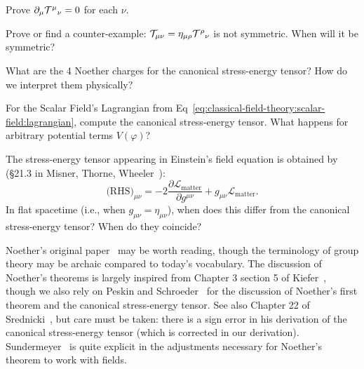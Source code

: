 \begin{exercise}
Prove $\partial_{\mu}{\mathcal{T}^{\mu}}_{\nu}=0$ for each $\nu$.
\end{exercise}

\begin{exercise}
Prove or find a counter-example: $\mathcal{T}_{\mu\nu}=\eta_{\mu\rho}{\mathcal{T}^{\rho}}_{\nu}$
is not symmetric. When will it be symmetric?
\end{exercise}

\begin{exercise}
What are the 4 Noether charges for the canonical stress-energy tensor?
How do we interpret them physically?
\end{exercise}

\begin{exercise}
For the Scalar Field's Lagrangian from Eq~\eqref{eq:classical-field-theory:scalar-field:lagrangian},
compute the canonical stress-energy tensor. What happens for arbitrary
potential terms $V(\varphi)$?
\end{exercise}

\begin{exercise}
The stress-energy tensor appearing in Einstein's field equation is
obtained by (\S21.3 in Misner, Thorne, Wheeler~\cite{Misner:1973prb}):
\begin{equation}
\mbox{(RHS)}_{\mu\nu} = -2\frac{\partial\mathcal{L}_{\text{matter}}}{\partial g^{\mu\nu}}
+ g_{\mu\nu}\mathcal{L}_{\text{matter}}.
\end{equation}
In flat spacetime (i.e., when $g_{\mu\nu}=\eta_{\mu\nu}$), when does
this differ from the canonical stress-energy tensor? When do they coincide?
\end{exercise}

Noether's original paper~\cite{Noether1918:iv} may be worth reading,
though the terminology of group theory may be archaic compared to
today's vocabulary.
The discussion of Noether's theorems is largely inspired from Chapter 3
section 5 of Kiefer~\cite{Kiefer:2007ria},
though we also rely on Peskin and Schroeder~\cite{Peskin:1995ev} for the
discussion of Noether's first theorem and the canonical stress-energy
tensor. See also Chapter 22 of Srednicki~\cite{Srednicki:2007qs}, but
care must be taken: there is a sign error in his derivation of the
canonical stress-energy tensor (which is corrected in our derivation).
Sundermeyer~\cite{Sundermeyer:1982gv} is quite explicit in the
adjustments necessary for Noether's theorem to work with fields.